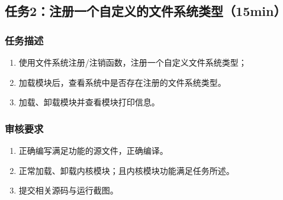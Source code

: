 \documentclass{article}
\begin{document}
\subsection{任务2：注册一个自定义的文件系统类型（15min）}

\subsubsection{任务描述}
\begin{enumerate}
    \item 使用文件系统注册/注销函数，注册一个自定义文件系统类型；
    \item 加载模块后，查看系统中是否存在注册的文件系统类型。
    \item 加载、卸载模块并查看模块打印信息。
\end{enumerate}

\subsubsection{审核要求}
\begin{enumerate}
    \item 正确编写满足功能的源文件，正确编译。
    \item 正常加载、卸载内核模块；且内核模块功能满足任务所述。
    \item 提交相关源码与运行截图。
\end{enumerate}
\end{document}

